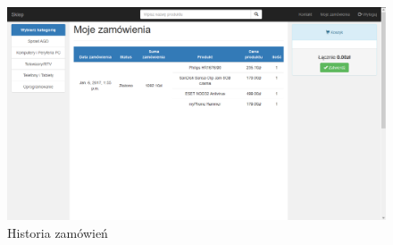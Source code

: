\documentclass[10pt,a4paper]{article}
\begin{document}
\begin{landscape}
     	\newpage
	    \begin{figure}[H]
   		\caption{Historia zamówień}
   		\centering
   		\includegraphics[scale=0.6]{orders}
		\end{figure}
   		
   		\end{landscape}
\end{document}
